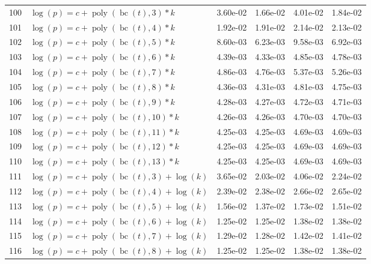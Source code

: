 \documentclass[12pt,a4paper]{article}
\DeclareMathOperator{\bc}{bc}
\DeclareMathOperator{\poly}{poly}
\begin{document}
\begin{longtable}[t]{ll>{\raggedleft\arraybackslash}p{2cm}>{\raggedleft\arraybackslash}p{2cm}>{\raggedleft\arraybackslash}p{2cm}>{\raggedleft\arraybackslash}p{2cm}}
100 & $\log(p) = c + \poly\left( \bc(t), 3 \right) * k$ & 3.60e-02 & 1.66e-02 & 4.01e-02 & 1.84e-02\\
\rowcolor{gray!6}  101 & $\log(p) = c + \poly\left( \bc(t), 4 \right) * k$ & 1.92e-02 & 1.91e-02 & 2.14e-02 & 2.13e-02\\
102 & $\log(p) = c + \poly\left( \bc(t), 5 \right) * k$ & 8.60e-03 & 6.23e-03 & 9.58e-03 & 6.92e-03\\
\rowcolor{gray!6}  103 & $\log(p) = c + \poly\left( \bc(t), 6 \right) * k$ & 4.39e-03 & 4.33e-03 & 4.85e-03 & 4.78e-03\\
104 & $\log(p) = c + \poly\left( \bc(t), 7 \right) * k$ & 4.86e-03 & 4.76e-03 & 5.37e-03 & 5.26e-03\\
\rowcolor{gray!6}  105 & $\log(p) = c + \poly\left( \bc(t), 8 \right) * k$ & 4.36e-03 & 4.31e-03 & 4.81e-03 & 4.75e-03\\
106 & $\log(p) = c + \poly\left( \bc(t), 9 \right) * k$ & 4.28e-03 & 4.27e-03 & 4.72e-03 & 4.71e-03\\
\rowcolor{gray!6}  107 & $\log(p) = c + \poly\left( \bc(t), 10 \right) * k$ & 4.26e-03 & 4.26e-03 & 4.70e-03 & 4.70e-03\\
108 & $\log(p) = c + \poly\left( \bc(t), 11 \right) * k$ & 4.25e-03 & 4.25e-03 & 4.69e-03 & 4.69e-03\\
\rowcolor{gray!6}  109 & $\log(p) = c + \poly\left( \bc(t), 12 \right) * k$ & 4.25e-03 & 4.25e-03 & 4.69e-03 & 4.69e-03\\
110 & $\log(p) = c + \poly\left( \bc(t), 13 \right) * k$ & 4.25e-03 & 4.25e-03 & 4.69e-03 & 4.69e-03\\
\rowcolor{gray!6}  111 & $\log(p) = c + \poly\left( \bc(t), 3 \right) + \log(k)$ & 3.65e-02 & 2.03e-02 & 4.06e-02 & 2.24e-02\\
112 & $\log(p) = c + \poly\left( \bc(t), 4 \right) + \log(k)$ & 2.39e-02 & 2.38e-02 & 2.66e-02 & 2.65e-02\\
\rowcolor{gray!6}  113 & $\log(p) = c + \poly\left( \bc(t), 5 \right) + \log(k)$ & 1.56e-02 & 1.37e-02 & 1.73e-02 & 1.51e-02\\
114 & $\log(p) = c + \poly\left( \bc(t), 6 \right) + \log(k)$ & 1.25e-02 & 1.25e-02 & 1.38e-02 & 1.38e-02\\
\rowcolor{gray!6}  115 & $\log(p) = c + \poly\left( \bc(t), 7 \right) + \log(k)$ & 1.29e-02 & 1.28e-02 & 1.42e-02 & 1.41e-02\\
116 & $\log(p) = c + \poly\left( \bc(t), 8 \right) + \log(k)$ & 1.25e-02 & 1.25e-02 & 1.38e-02 & 1.38e-02\\

\end{longtable}
\end{document}
